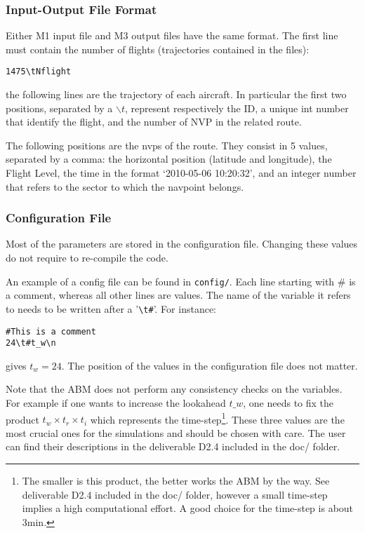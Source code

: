\documentclass[12pt]{article}
\begin{document}
\subsubsection{Input-Output File Format}

Either M1 input file and M3 output files have the same format. The first line must contain the number of flights (trajectories contained in the files):
\begin{verbatim}
1475\tNflight
\end{verbatim}
the following lines are the trajectory of each aircraft. In particular the first two positions, separated by a $\backslash t$,  represent respectively the ID, a unique int number that identify the flight, and the number of NVP in the related route. 

The following positions are the nvps of the route. They consist in 5 values, separated by a comma: the horizontal position (latitude and longitude), the Flight Level, the time in the format `2010-05-06 10:20:32', and an integer number that refers to the sector to which the navpoint belongs. 

\subsubsection{Configuration File}
Most of the parameters are stored in the configuration file. Changing these values do not require to re-compile the code. 

An example of a config file can be found in \verb|config/|. Each line starting with $\#$ is a comment, whereas all other lines are values. The name of the variable it refers to needs to be written after a '\verb|\t#|'. For instance:
\begin{verbatim}
#This is a comment
24\t#t_w\n
\end{verbatim}
gives $t_w = 24$. The position of the values in the configuration file does not matter.

Note that the ABM does not perform any consistency checks on the variables. For example if one wants to increase the lookahead $t\_w$, one needs to fix the product $t_w \times t_r \times t_i$ which represents the time-step\footnote{The smaller is this product, the better works the ABM by the way. See deliverable D2.4 included in the doc/ folder, however a small time-step implies a high computational effort. A good choice for the time-step is about 3min.}. These three values are the most crucial ones for the simulations and should be chosen with care. The user can find their descriptions in the deliverable D2.4 included in the doc/ folder.
\\
\end{document}

